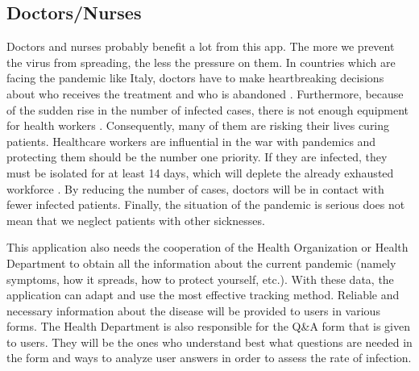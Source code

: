  \subsection{Doctors/Nurses}
    \par Doctors and nurses probably benefit a lot from this app. The more we prevent the virus from spreading, the less the pressure on them. In countries which are facing the pandemic like Italy, doctors have to make heartbreaking decisions about who receives the treatment and who is abandoned \parencite{Stake3}. Furthermore, because of the sudden rise in the number of infected cases, there is not enough equipment for health workers \parencite{Stake4}. Consequently, many of them are risking their lives curing patients. Healthcare workers are influential in the war with pandemics and protecting them should be the number one priority. If they are infected, they must be isolated for at least 14 days, which will deplete the already exhausted workforce \parencite{Stake5}. By reducing the number of cases, doctors will be in contact with fewer infected patients. Finally, the situation of the pandemic is serious does not mean that we neglect patients with other sicknesses.
    \par This application also needs the cooperation of the  Health  Organization or Health Department to obtain all the information about the current pandemic (namely symptoms,  how it spreads,  how to protect yourself,  etc.).  With these data,  the application can adapt and use the most effective tracking method. Reliable and necessary information about the disease will be provided to users in various forms. The Health Department is also responsible for the Q\&A form that is given to users. They will be the ones who understand best what questions are needed in the form and ways to analyze user answers in order to assess the rate of infection.

